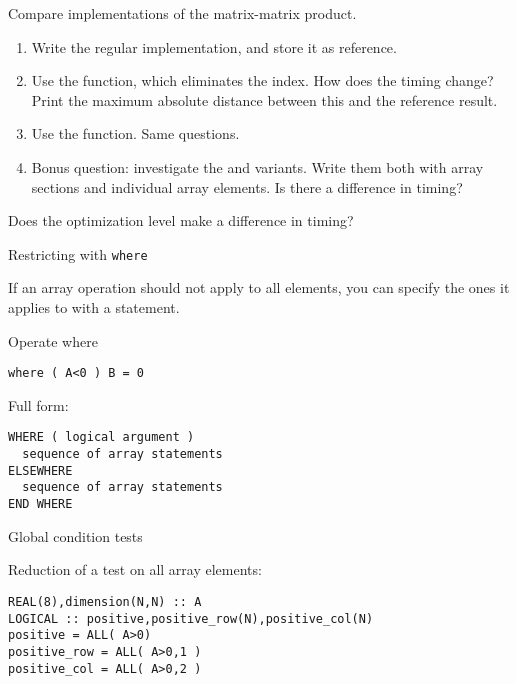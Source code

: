 \begin{exercise}
  \label{ex:fmatmul}
  Compare implementations of the matrix-matrix product.
  \begin{enumerate}
  \item Write the regular  implementation, and store it as
    reference.
  \item Use the  function, which eliminates the 
    index. How does the timing change? Print the maximum absolute
    distance between this and the reference result.
  \item Use the  function. Same questions.
  \item Bonus question: investigate the  and 
    variants. Write them both with array sections and individual array
    elements. Is there a difference in timing?
  \end{enumerate}
  Does the optimization level make a difference in timing?
\end{exercise}

 {Restricting with \tt{where}}

If an array operation should not apply to all elements, you can
specify the ones it applies to with a  statement.

\begin{block}{Operate where}
  \label{sl:farray-where}
\begin{lstlisting}
where ( A<0 ) B = 0
\end{lstlisting}

Full form:
\begin{lstlisting}
WHERE ( logical argument )
  sequence of array statements
ELSEWHERE
  sequence of array statements
END WHERE
\end{lstlisting}
\end{block}

 {Global condition tests}

Reduction of a test on all array elements:
\begin{lstlisting}
REAL(8),dimension(N,N) :: A
LOGICAL :: positive,positive_row(N),positive_col(N)
positive = ALL( A>0)
positive_row = ALL( A>0,1 )
positive_col = ALL( A>0,2 )
\end{lstlisting}

